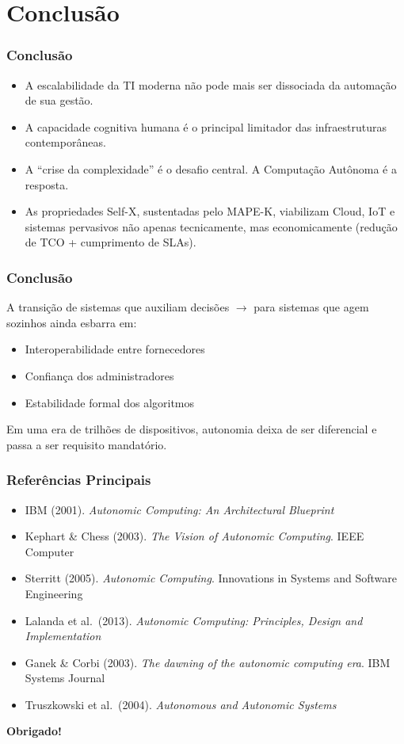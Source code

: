 \documentclass{beamer}
\begin{document}
  \section{Conclusão}

  \begin{frame}
    \frametitle{Conclusão}
    \begin{itemize}
      \item A escalabilidade da TI moderna não pode mais ser dissociada da automação de sua gestão.
      \item A capacidade cognitiva humana é o principal limitador das infraestruturas contemporâneas.
      \item A ``crise da complexidade'' é o desafio central. A Computação Autônoma é a resposta.
      \item As propriedades Self-X, sustentadas pelo MAPE-K, viabilizam Cloud, IoT e sistemas pervasivos não apenas tecnicamente, mas economicamente (redução de TCO + cumprimento de SLAs).
    \end{itemize}
  \end{frame}

  \begin{frame}
    \frametitle{Conclusão}
    A transição de sistemas que auxiliam decisões $\rightarrow$ para sistemas que agem sozinhos ainda esbarra em:
    \begin{itemize}
      \item Interoperabilidade entre fornecedores
      \item Confiança dos administradores
      \item Estabilidade formal dos algoritmos
    \end{itemize}

    Em uma era de trilhões de dispositivos, autonomia deixa de ser diferencial e passa a ser requisito mandatório.
  \end{frame}

  \begin{frame}
    \frametitle{Referências Principais}
    \begin{itemize}
      \item IBM (2001). \textit{Autonomic Computing: An Architectural Blueprint}
      \item Kephart \& Chess (2003). \textit{The Vision of Autonomic Computing}. IEEE Computer
      \item Sterritt (2005). \textit{Autonomic Computing}. Innovations in Systems and Software Engineering
      \item Lalanda et al.\ (2013). \textit{Autonomic Computing: Principles, Design and Implementation}
      \item Ganek \& Corbi (2003). \textit{The dawning of the autonomic computing era}. IBM Systems Journal
      \item Truszkowski et al.\ (2004). \textit{Autonomous and Autonomic Systems}
    \end{itemize}
    \vspace{0.4cm}
    \centering
    \Large \textbf{Obrigado!}
  \end{frame}
\end{document}
